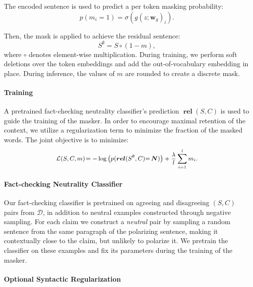 \documentclass[letterpaper]{article} %
\DeclareMathOperator{\rel}{\boldsymbol{rel}}
\DeclareMathOperator{\N}{\boldsymbol{N}}
\begin{document}
The encoded sentence is used to predict a per token masking probability:
\begin{equation}
	p(m_i = 1) = \sigma(g(z; \boldsymbol{w}_g)_i).
\label{eq:mask_prob}
\end{equation}

Then, the mask is applied to achieve the residual sentence:
\begin{equation}
    S^{\emptyset} = S \circ (1-m),
\end{equation}
where $\circ$ denotes element-wise multiplication. During training, we perform soft deletions over the token embeddings and add the out-of-vocabulary embedding in place. During inference, the values of $m$ are rounded to create a discrete mask.



\paragraph{Training}
A pretrained fact-checking neutrality classifier's prediction $\rel(S,C)$ is used to guide the training of the masker. In order to encourage maximal retention of the context, we utilize a regularization term to minimize the fraction of the masked words. The joint objective is to minimize:
\begin{equation}
    \small{
    \mathcal{L}(S,C,m)\!= - \log \left(p(\rel(S^\emptyset,C){=}\N)\right) + \frac{\lambda}{l} \sum_{i=1}^{l} m_i.
    }
\label{eq:mask_gen_loss}
\end{equation}


\paragraph{Fact-checking Neutrality Classifier} \label{sec:neutral_classifier}
 Our fact-checking classifier is pretrained on agreeing and disagreeing $(S,C)$ pairs from $\mathcal{D}$, in addition to neutral examples constructed through negative sampling. For each claim we construct a \textit{neutral} pair by sampling a random sentence from the same paragraph of the polarizing sentence, making it contextually close to the claim, but unlikely to polarize it. We pretrain the classifier on these examples and fix its parameters during the training of the masker.



\paragraph{Optional Syntactic Regularization}
\end{document}
